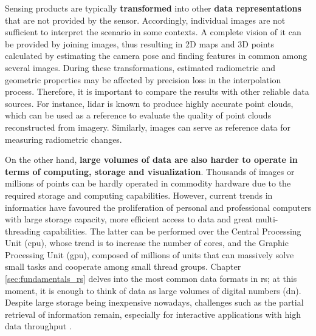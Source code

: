Sensing products are typically \textbf{transformed} into other \textbf{data representations} that are not provided by the sensor. Accordingly, individual images are not sufficient to interpret the scenario in some contexts. A complete vision of it can be provided by joining images, thus resulting in 2D maps and 3D points calculated by estimating the camera pose and finding features in common among several images. During these transformations, estimated radiometric and geometric properties may be affected by precision loss in the interpolation process. Therefore, it is important to compare the results with other reliable data sources. For instance, \acrshort{lidar} is known to produce highly accurate point clouds, which can be used as a reference to evaluate the quality of point clouds reconstructed from imagery. Similarly, images can serve as reference data for measuring radiometric changes.  

On the other hand, \textbf{large volumes of data are also harder to operate in terms of computing, storage and visualization}. Thousands of images or millions of points can be hardly operated in commodity hardware due to the required storage and computing capabilities. However, current trends in informatics have favoured the proliferation of personal and professional computers with large storage capacity, more efficient access to data and great multi-threading capabilities. The latter can be performed over the Central Processing Unit (\acrshort{cpu}), whose trend is to increase the number of cores, and the Graphic Processing Unit (\acrshort{gpu}), composed of millions of units that can massively solve small tasks and cooperate among small thread groups. Chapter \ref{sec:fundamentals_rs} delves into the most common data formats in \acrshort{rs}; at this moment, it is enough to think of data as large volumes of digital numbers (\acrshort{dn}). Despite large storage being inexpensive nowadays, challenges such as the partial retrieval of information remain, especially for interactive applications with high data throughput \cite{bejar-martos_strategies_2022, ogayar-anguita_nested_2023}. 

